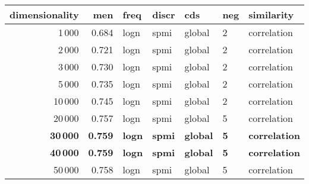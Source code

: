 \begin{tabular}{rrlllll}
\toprule
 dimensionality &    men &  freq & discr &     cds & neg &   similarity \\
\midrule
           1\,000 &  0.684 &  logn &  spmi &  global &   2 &  correlation \\
           2\,000 &  0.721 &  logn &  spmi &  global &   2 &  correlation \\
           3\,000 &  0.730 &  logn &  spmi &  global &   2 &  correlation \\
           5\,000 &  0.735 &  logn &  spmi &  global &   2 &  correlation \\
          10\,000 &  0.745 &  logn &  spmi &  global &   2 &  correlation \\
          20\,000 &  0.757 &  logn &  spmi &  global &   5 &  correlation \\
          \textbf{30\,000} &  \textbf{0.759} &  \textbf{logn} &  \textbf{spmi} &  \textbf{global} &   \textbf{5} &  \textbf{correlation} \\
          \textbf{40\,000} &  \textbf{0.759} &  \textbf{logn} &  \textbf{spmi} &  \textbf{global} &   \textbf{5} &  \textbf{correlation} \\
          50\,000 &  0.758 &  logn &  spmi &  global &   5 &  correlation \\
\bottomrule
\end{tabular}
